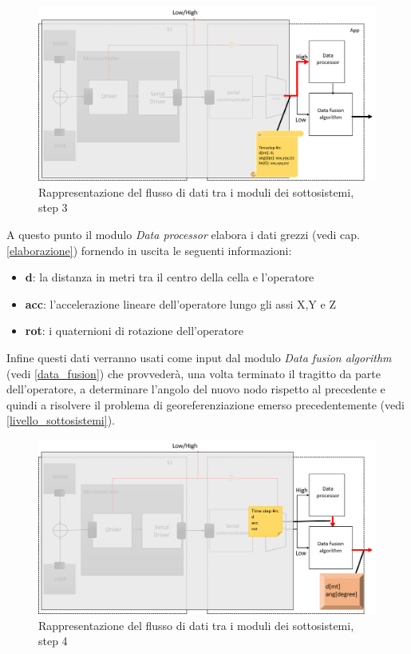  \begin{figure}[H]  
 	\centering 
 	\includegraphics[scale=0.25 ]{DescrizioneDelSistema/flusso3.png}
 	\caption{Rappresentazione del flusso di dati tra i moduli dei sottosistemi, step 3}
 	\label{fig:flusso3}
 \end{figure}
\newpage
A questo punto il modulo \textit{Data processor} elabora i dati grezzi (vedi cap.\ref{elaborazione}) fornendo in uscita le seguenti informazioni:
\begin{itemize}
	\item \textbf{d}: la distanza in metri tra il centro della cella e l'operatore
	\item \textbf{acc}: l'accelerazione lineare dell'operatore lungo gli assi X,Y e Z
	\item \textbf{rot}: i quaternioni di rotazione dell'operatore
\end{itemize}
Infine questi dati verranno usati come input dal modulo \textit{Data fusion algorithm} (vedi \ref{data_fusion}) che provvederà, una volta terminato il tragitto da parte dell'operatore, a determinare l'angolo del nuovo nodo rispetto al precedente e quindi a risolvere il problema di georeferenziazione emerso precedentemente (vedi \ref{livello_sottosistemi}).
 \begin{figure}[H]  
	\centering 
	\includegraphics[scale=0.25 ]{DescrizioneDelSistema/flusso4.png}
	\caption{Rappresentazione del flusso di dati tra i moduli dei sottosistemi, step 4}
	\label{fig:flusso4}
\end{figure}